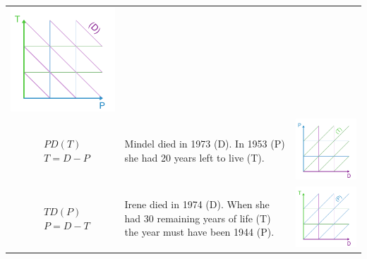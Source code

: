\documentclass[12pt,oneside,a4paper]{article} %
\theoremstyle{definition}
\begin{document}
\begin{longtable}{m{}L{0.4\textwidth}m{0.2\textwidth}}
  \includegraphics[scale=.5]{Figures/DiagramTable/TP_rt.pdf} %
   \\
  $$\begin{aligned}
    &PD(T) \\
    &T = D - P
  \end{aligned}$$ &
  Mindel died in 1973 (D). In 1953 (P) she had 20 years left to live (T). &
  \includegraphics[scale=.5]{Figures/DiagramTable/PD_rt.pdf} %
   \\
  $$\begin{aligned}
    &TD(P) \\
    &P = D - T
  \end{aligned}$$ &
  Irene died in 1974 (D). When she had 30 remaining years of life (T) the year must have been 1944 (P). &
  \includegraphics[scale=.5]{Figures/DiagramTable/TD_rt.pdf} %

\end{longtable}
\end{document}
